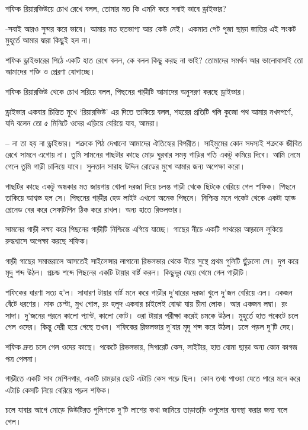 \documentclass[
]{book}
\begin{document}
শফিক রিয়ারভিউয়ে চোখ রেখে বলল, তোমার মত কি এমনি করে সবাই ভাবে ড্রাইভার?

-সবাই আরও সুন্দর করে ভাবে। আমার মত হতভাগ্য আর কেউ নেই। একমাত্র পেট পূজা ছাড়া জাতির এই সংকট মুহূর্তে আমার দ্বারা কিছুই হল না।

শফিক ড্রাইভারের পিঠে একটি হাত রেখে বলল, কে বলল কিছু করছ না ভাই? তোমাদের সমর্থন আর ভালোবাসাই তো আমাদের শক্তি ও প্রেরণা যোগাচ্ছে।

শফিক রিয়ারভিউ থেকে চোখ সরিয়ে বলল, পিছনের গাড়ীটি আমাদের অনুসরণ করছে ড্রাইভার।

ড্রাইভার একবার চিন্তিত মুখে `রিয়ারভিউ' এর দিতে তাকিয়ে বলল, শহরের প্রতিটি গলি কুজো পথ আমার নখদপর্ণে, যদি বলেন তো ৫ মিনিটে ওদের এড়িয়ে বেরিয়ে যাব, আমরা।

-- না তা হয় না ড্রাইভার। শত্রুকে পিঠ দেখানো আমাদের ঐতিহ্যের বিপরীত। সাইমুমের কোন সদস্যই শত্রুকে জীবিত রেখে সামনে এগোয় না। তুমি সামনের গাছটার কাছে মোড় ঘুরবার সময় গাড়ির গতি একটু কমিয়ে দিবে। আমি নেমে গেলে তুমি গাড়ী চালিয়ে যাবে। সুলতান সারাহ উদ্দিন রোডের মুখে আমার জন্য অপেক্ষা করো।

গাছটির কাছে একটু অন্ধকার মত জায়গায় খোলা দরজা দিয়ে চলন্ত গাড়ী থেকে ছিটকে বেরিয়ে গেল শফিক। পিছনে তাকিয়ে আশ্বস্ত হল সে। পিছনের গাড়ীর হেড লাইট এখনো অনেক পিছনে। নিশ্চিন্ত মনে পকেট থেকে একটা হ্যান্ড গ্রেনেড বের করে সেফটিপিন ঠিক করে রাখল। অন্য হাতে রিভলভার।

সামনের গাড়ী লক্ষ্য করে পিছনের গাড়ীটি নিশ্চিন্তে এগিয়ে যাচ্ছে। গাছের নীচে একটি পাথরের আড়ালে লুকিয়ে রুদ্ধশ্বাসে অপেক্ষা করছে শফিক।

গাড়ী গাছের সমান্তরালে আসতেই সাইলেন্সার লাগানো রিভলভার থেকে ধীরে সুস্থে প্রথম গুলিটি ছুঁড়লো সে। দুপ করে মৃদু শব্দ উঠল। প্রচন্ড শব্দে পিছনের একটি টায়ার বার্ষ্ট করল। কিছুদূর যেয়ে থেমে গেল গাড়ীটি।

শফিকের ধারণা সত্য হ'ল। সাধারণ টায়ার বার্ষ্ট মনে করে গাড়ীর দু'ধারের দরজা খুলে দু'জন বেরিয়ে এল। একজন বেঁটে ধরণের। নাক চেপ্টা, মুখ গোল, রং হলুদ একবার চাইলেই বোঝা যায় চীনা লোক। আর একজন লম্বা। রং সাদা। দু'জনের পরনে কালো প্যান্ট, কালো কোট। ওরা টায়ার পরীক্ষা করেই চমকে উঠল। মুহুর্তে হাত পকেটে চলে গেল ওদের। কিন্তু দেরী হয়ে গেছে তখন। শফিকের রিভলভার দু'বার মৃদু শব্দ করে উঠল। ঢলে পড়ল দু'টি দেহ।

শফিক দ্রুত চলে গেল ওদের কাছে। পকেটে রিভলভার, সিগারেট কেস, লাইটার, হাত বোমা ছাড়া অন্য কোন কাগজ পত্র পেলনা।

গাড়ীতে একটি সাব মেশিনগার, একটি চামড়ার ছোট এটাচি কেস পড়ে ছিল। কোন তথ্য পাওয়া যেতে পারে মনে করে এটাচি কেসটি নিয়ে বেরিয়ে পড়ল শফিক।

চলে যাবার আগে মোড়ে ডিউটিরত পুলিশকে দু'টি লাশের কথা জানিয়ে তাড়াতড়ি ওগুলোর ব্যবস্থা করার জন্য বলে গেল।
\end{document}
